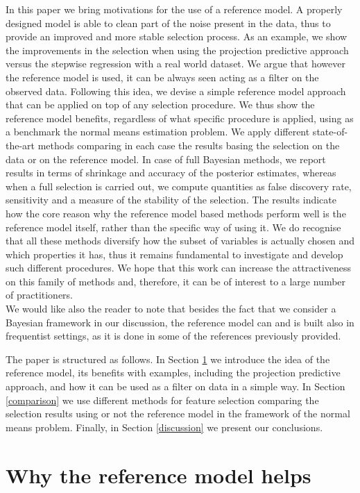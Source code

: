 \documentclass[american,]{article}
\theoremstyle{definition}
\begin{document}
In this paper we bring motivations for the use of a reference model. A properly designed model is able to clean part of the noise present in the data, thus to provide an improved and more stable selection process. As an example, we show the improvements in the selection when using the projection predictive approach versus the stepwise regression with a real world dataset. We argue that however the reference model is used, it can be always seen acting as a filter on the observed data. Following this idea, we devise a simple reference model approach that can be applied on top of any selection procedure. We thus show the reference model benefits, regardless of what specific procedure is applied, using as a benchmark the normal means estimation problem. We apply different state-of-the-art methods comparing in each case the results basing the selection on the data or on the reference model. In case of full Bayesian methods, we report results in terms of shrinkage and accuracy of the posterior estimates, whereas when a full selection is carried out, we compute quantities as false discovery rate, sensitivity and a measure of the stability of the selection. The results indicate how the core reason why the reference model based methods perform well is the reference model itself, rather than the specific way of using it. We do recognise that all these methods diversify how the subset of variables is actually chosen and which properties it has, thus it remains fundamental to investigate and develop such different procedures. We hope that this work can increase the attractiveness on this family of methods and, therefore, it can be of interest to a large number of practitioners.
\\
We would like also the reader to note that besides the fact that we consider a Bayesian framework in our discussion, the reference model can and is built also in frequentist settings, as it is done in some of the references previously provided.

The paper is structured as follows. In Section \ref{reference-model-approach} we introduce the idea of the reference model, its benefits with examples, including the projection predictive approach, and how it can be used as a filter on data in a simple way. In Section \ref{comparison} we use different methods for feature selection comparing the selection results using or not the reference model in the framework of the normal means problem. Finally, in Section \ref{discussion} we present our conclusions.

\hypertarget{reference-model-approach}{%
\section{Why the reference model helps}\label{reference-model-approach}}
\end{document}
